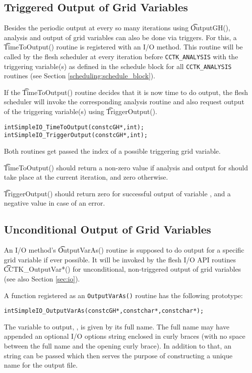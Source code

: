 \subsection{Triggered Output of Grid Variables}
%
Besides the periodic output at every so many iterations using {\t OutputGH()},
analysis and output of grid variables can also be done via triggers. For this,
a {\t TimeToOutput()} routine is registered with an I/O method.
This routine will be called by the flesh scheduler at every iteration before
{\tt CCTK\_ANALYSIS} with the triggering variable(s) as defined in the schedule
block for all {\tt CCTK\_ANALYSIS} routines (see Section \ref{scheduling:schedule_block}).

If the {\t TimeToOutput()} routine decides that it is now time to do output, the
flesh scheduler will invoke the corresponding analysis routine and also request
output of the triggering variable(s) using {\t TriggerOutput()}.
%
\begin{alltt}
  int SimpleIO_TimeToOutput (const cGH *, int );
  int SimpleIO_TriggerOutput (const cGH *, int );
\end{alltt}
%
Both routines get passed the index of a possible triggering grid variable.

{\t TimeToOutput()} should return a non-zero value if analysis and output
for \texttt{} should take place at the current iteration, and zero
otherwise.

{\t TriggerOutput()} should return zero for successful output of variable
\texttt{}, and a negative value in case of an error.
%
%
\subsection{Unconditional Output of Grid Variables}

An I/O method's {\t OutputVarAs()} routine is supposed to do output for a
specific grid variable if ever possible. It will be invoked by the flesh I/O API
routines {\t CCTK\_OutputVar*()} for unconditional, non-triggered output of
grid variables (see also Section \ref{sec:io}).

A function registered as an \texttt{OutputVarAs()} routine has the following
prototype:
%
\begin{alltt}
  int SimpleIO_OutputVarAs (const cGH *, const char *, const char *);
\end{alltt}
%
The variable to output, \texttt{}, is given by its full name.
The full name may have appended an optional I/O options string enclosed in
curly braces (with no space between the full name and the opening curly brace).
In addition to that, an \texttt{} string can be passed which then
serves the purpose of constructing a unique name for the output file.

